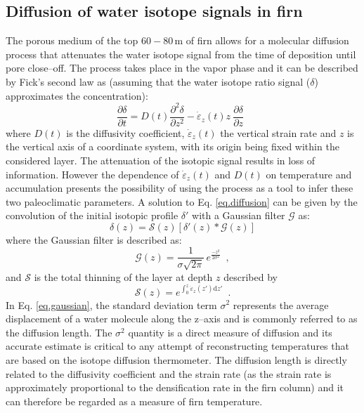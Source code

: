 \documentclass[11pt, draftcls, onecolumn]{IEEEtran} %
\numberwithin{equation}{section}
\numberwithin{table}{section}
\numberwithin{figure}{section}
\begin{document}
\subsection{Diffusion of water isotope signals in firn}
The porous medium of the top $60-80\, \mathrm{m}$ of firn allows for a molecular diffusion process that attenuates
the water isotope signal from the time of deposition until  pore close--off. 
The process takes place in the vapor phase and it can be described by Fick's second law as
(assuming that the water isotope ratio signal ($\delta$) approximates the concentration):
\begin{equation}
\frac{\partial \delta}{\partial t} = D \left( t \right) \frac{\partial^2 \delta}{\partial z^2} - 
\dot{\varepsilon}_z \left( t \right) z ~\frac{\partial \delta}{\partial z} \enspace 
\label{eq.diffusion}
\end{equation}
where $D \left( t \right)$ is the diffusivity coefficient, $\dot{\varepsilon}_z\left(t\right)$
the vertical strain rate and  $z$ is the vertical axis of a coordinate system, 
with its origin being fixed within the considered layer.
The attenuation of the isotopic signal results in loss of information.
However the dependence of $\dot{\varepsilon}_z\left(t\right)$  and $D \left( t \right)$ 
on temperature and accumulation presents the possibility of using the process as a tool
to infer these two paleoclimatic parameters. A solution to Eq. \ref{eq.diffusion} can be given by
the convolution of the initial isotopic profile $\delta'$ with a Gaussian filter $\mathcal{G}$ as:
\begin{equation}
\delta \left( z\right) = \mathcal{S} \left( z \right) \left[ \delta ' \left( z \right) 
\ast \mathcal{G} \left( z \right) \right]
\label{eq.convolution}
\end{equation}
where the Gaussian filter is described as:
\begin{equation}
\mathcal{G}\left(z \right) = \frac{1}{\sigma \sqrt{2\pi}} \, e^{\frac{-z^2}{2 \sigma^2}} \enspace ,
\label{eq.gaussian}
\end{equation}
and $\mathcal{S}$ is the total thinning of the layer at depth $z$ described by
\begin{equation}
\mathcal{S} \left( z \right) = e^{\int_0^{z} \dot{\varepsilon}_z \left( z' \right) \mathrm{d}z'} \enspace .
\label{eq.thinning}
\end{equation}
In Eq. \ref{eq.gaussian}, the standard deviation term $\sigma^2$ represents the average 
displacement of a water molecule along the z--axis and is commonly referred to as the diffusion length.
The $\sigma^2$ quantity is a direct measure of diffusion and its accurate estimate is critical
to any attempt of reconstructing temperatures that are based on the isotope diffusion thermometer.  
The diffusion length is directly related to the diffusivity coefficient and the strain rate 
(as the strain rate is approximately proportional to the densification rate in the firn column)
and it can therefore be regarded as a measure of firn temperature.
\end{document}
